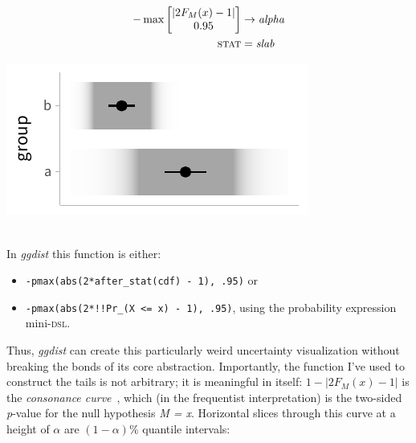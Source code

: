 \documentclass[journal]{vgtc}                     %
\newcommand{\equationfigure}[2]{%
\noindent
\begin{minipage}{.5\columnwidth}
\setlength{\abovedisplayskip}{0pt}
\setlength{\belowdisplayskip}{0pt}
#1\end{minipage}%
\begin{minipage}{.4\columnwidth}\centering #2 \end{minipage}%
\vspace{.5\belowdisplayskip}\\
}
\begin{document}
\equationfigure{
\begin{align*}
-\max \left[ \begin{matrix} \lvert 2 F_M(x) - 1 \rvert \\ 0.95 \end{matrix} \right] &\rightarrow \textit{alpha}\\
\textsc{stat} &= \mathit{slab}
\end{align*}
}{\includegraphics[width=1.2\columnwidth]{figs/3-slab_gradient_correll.pdf}}
In \textit{ggdist} this function is either:
\begin{itemize}
    \item \texttt{-pmax(abs(2*after\_stat(cdf) - 1), .95)} or
    \item    \texttt{-pmax(abs(2*!!Pr\_(X <= x) - 1), .95)}, using the probability expression mini-\textsc{dsl}.
\end{itemize}

Thus, \textit{ggdist} can create this particularly weird uncertainty visualization without breaking the bonds of its core abstraction. Importantly, the function I've used to construct the tails is not arbitrary; it is meaningful in itself: $1 - \lvert 2 F_M(x) - 1 \rvert$ is the \textit{consonance curve}~\cite{amrhein2022discuss}, which (in the frequentist interpretation) is the two-sided \textit{p}-value for the null hypothesis \textit{M = x}. Horizontal slices through this curve at a height of $\alpha$ are $(1 - \alpha)\%$ quantile intervals:
\end{document}
